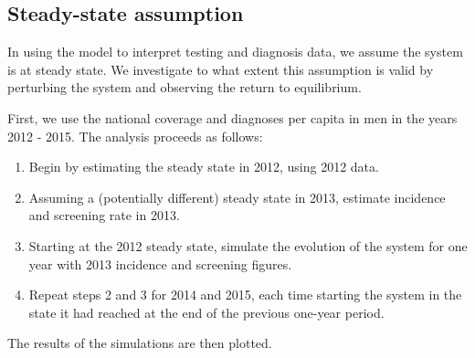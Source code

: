 \documentclass{article}
\providecommand{\tightlist}{%
      \setlength{\itemsep}{0pt}\setlength{\parskip}{0pt}}
\begin{document}
    \subsection{Steady-state assumption}\label{steady-state-assumption}

In using the model to interpret testing and diagnosis data, we assume
the system is at steady state. We investigate to what extent this
assumption is valid by perturbing the system and observing the return to
equilibrium.

First, we use the national coverage and diagnoses per capita in men in
the years 2012 - 2015. The analysis proceeds as follows:

\begin{enumerate}
\def\labelenumi{\arabic{enumi}.}
\tightlist
\item
  Begin by estimating the steady state in 2012, using 2012 data.
\item
  Assuming a (potentially different) steady state in 2013, estimate
  incidence and screening rate in 2013.
\item
  Starting at the 2012 steady state, simulate the evolution of the
  system for one year with 2013 incidence and screening figures.
\item
  Repeat steps 2 and 3 for 2014 and 2015, each time starting the system
  in the state it had reached at the end of the previous one-year
  period.
\end{enumerate}

The results of the simulations are then plotted.
\end{document}
